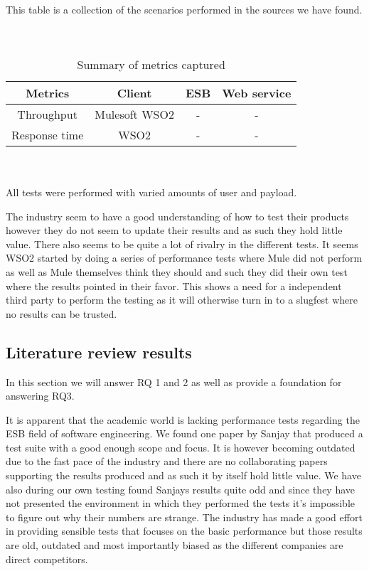 \begin{table}[H]
	This table is a collection of the scenarios performed in the sources we have found. 
	\\
	\\
	\\	
	\caption{Summary of metrics captured}
	\begin{tabular}{c c c c}
	Metrics &  Client & ESB & Web service \\
	\hline
	Throughput & Mulesoft \cite{mulesoft08} WSO2 \cite{Perera07R2,Perera07R3} & - & - \\
	Response time & WSO2 \cite{Perera07} & - & - \\
	\hline
	\end{tabular}
	\\
	\\
	All tests were performed with varied amounts of user and payload.
\end{table}

The industry seem to have a good understanding of how to test their products however they do not seem to update their results and as such they hold little value.
There also seems to be quite a lot of rivalry in the different tests. 
It seems WSO2 started by doing a series of performance tests \cite{Perera07,Perera07R2,Perera07R3}  where Mule did not perform as well as Mule themselves think they should and such they did their own test \cite{mulesoft08} where the results pointed in their favor.
This shows a need for a independent third party to perform the testing as it will otherwise turn in to a slugfest where no results can be trusted. 

\subsection{Literature review results}
\label{sec:litrev_results}
In this section we will answer RQ 1 and 2 as well as provide a foundation for answering RQ3.

It is apparent that the academic world is lacking performance tests regarding the ESB field of software engineering. 
We found one paper by Sanjay \cite{Sanjay2011} that produced a test suite with a good enough scope and focus. 
It is however becoming outdated due to the fast pace of the industry and there are no collaborating papers supporting the results produced and as such it by itself hold little value. 
We have also during our own testing found Sanjays results quite odd and since they have not presented the environment in which they performed the tests it's impossible to figure out why their numbers are strange. 
The industry has made a good effort in providing sensible tests that focuses on the basic performance but those results are old, outdated and most importantly biased as the different companies are direct competitors. 


